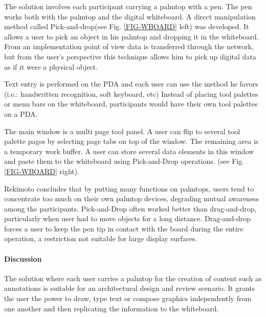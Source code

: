 The solution involves each participant carrying a palmtop with a pen.
The pen works both with the palmtop and the digital whiteboard.
A direct manipulation method called Pick-and-drop(see Fig. \ref{FIG-WBOARD} left) was developed.
It allows a user to pick an object in his palmtop and dropping it in the whiteboard.
From an implementation point of view data is transferred through the network,
but from the user's perspective this technique allows him to pick up digital data
as if it were a physical object.

Text entry is performed on the PDA and each user can use the method he favors
(i.e.: handwritten recognition, soft keyboard, etc)
Instead of placing tool palettes or menu bars on the whiteboard,
participants would have their own tool palettes on a PDA.

The main window is a multi page tool panel.
A user can flip to several tool palette pages by selecting page tabs on top of the window.
The remaining area is a temporary work buffer.
A user can store several data elements in this window and paste them
to the whiteboard using Pick-and-Drop operations. (see Fig. \ref{FIG-WBOARD} right).

Rekimoto concludes that by putting many functions on palmtops,
users tend to concentrate too much on their own palmtop devices,
degrading mutual awareness among the participants.
Pick-and-Drop often worked better than drag-and-drop,
particularly when user had to move objects for a long distance.
Drag-and-drop forces a user to keep the pen tip in contact
with the board during the entire operation,
a restriction not suitable for large display surfaces.

\paragraph{Discussion}

The solution where each user carries a palmtop for the creation of content such as annotations
is suitable for an architectural design and review scenario.
It grants the user the power to draw, type text or compose graphics 
independently from one another and then replicating the information to the whiteboard.
